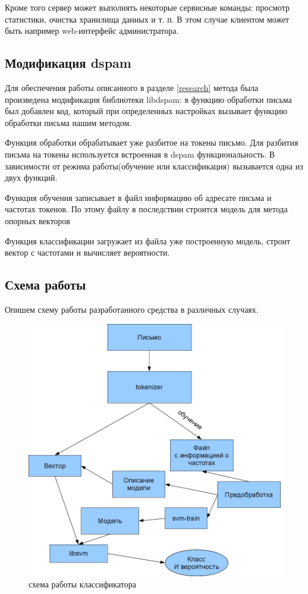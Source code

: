 Кроме того сервер может выполнять некоторые сервисные команды: просмотр статистики, очистка хранилища данных и т. п. В этом случае клиентом может быть например web-интерфейс администратора.


\subsection{Модификация dspam}
Для обеспечения работы описанного в разделе \ref{research} метода была произведена модификация библиотеки libdspam: в функцию обработки письма был добавлен код, который при определенных настройках вызывает функцию обработки письма нашим методом.

Функция обработки обрабатывает уже разбитое на токены письмо. Для разбития письма на токены используется встроенная в dspam функциональность. В зависимости от режима работы(обучение или классификация) вызывается одна из двух функций.

Функция обучения записывает в файл информацию об адресате письма и частотах токенов. По этому файлу в последствии строится модель для метода опорных векторов

Функция классификации загружает из файла уже построенную модель, строит вектор с частотами и вычисляет вероятности.

\subsection{Схема работы}
Опишем схему работы разработанного средства в различных случаях.
\begin{figure}[h]
\begin{center}
\includegraphics[width=12cm]{img/working_scheme}
\end{center}
\caption{схема работы классификатора}
\label{dspamarch}
\end{figure}

